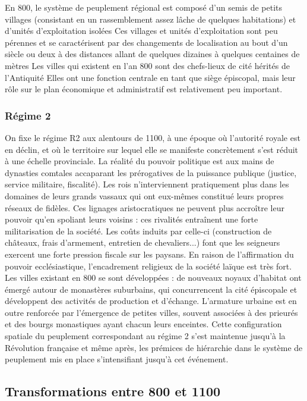En 800, le système de peuplement régional est composé d'un semis de petits villages (consistant en un rassemblement assez lâche de quelques habitations) et d'unités d'exploitation isolées
Ces villages et unités d'exploitation sont peu pérennes et se caractérisent par des changements de localisation au bout d'un siècle ou deux à des distances allant de quelques dizaines à quelques centaines de mètres
Les villes qui existent en l'an 800 sont des chefs-lieux de cité hérités de l'Antiquité
Elles ont une fonction centrale en tant que siège épiscopal, mais leur rôle sur le plan économique et administratif est relativement peu important.

\subsubsection{Régime 2}
On fixe le régime R2 aux alentours de 1100, à une époque où l'autorité royale est en déclin, et où le territoire sur lequel elle se manifeste concrètement s'est réduit à une échelle provinciale.
La réalité du pouvoir politique est aux mains de dynasties comtales accaparant les prérogatives de la puissance publique (justice, service militaire, fiscalité).
Les rois n'interviennent pratiquement plus dans les domaines de leurs grands vassaux qui ont eux-mêmes constitué leurs propres réseaux de fidèles.
Ces lignages aristocratiques ne peuvent plus accroître leur pouvoir qu'en spoliant leurs voisins : ces rivalités entraînent une forte militarisation de la société.
Les coûts induits par celle-ci (construction de châteaux, frais d'armement, entretien de chevaliers...) font que les seigneurs exercent une forte pression fiscale sur les paysans.
En raison de l'affirmation du pouvoir ecclésiastique, l'encadrement religieux de la société laïque est très fort.
Les villes existant en 800 se sont développées : de nouveaux noyaux d'habitat ont émergé autour de monastères suburbains, qui concurrencent la cité épiscopale et développent des activités de production et d'échange.
L'armature urbaine est en outre renforcée par l'émergence de petites villes, souvent associées à des prieurés et des bourgs monastiques ayant chacun leurs enceintes.
Cette configuration spatiale du peuplement correspondant au régime 2 s'est maintenue jusqu'à la Révolution française et même après, les prémices de hiérarchie dans le système de peuplement mis en place s'intensifiant jusqu'à cet événement.


\subsection{Transformations entre 800 et 1100}

